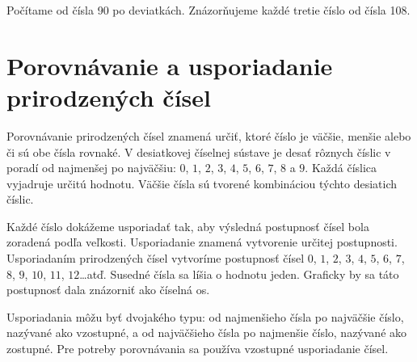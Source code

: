 \documentclass{article}
\begin{document}
\begin{center}
  Počítame od čísla 90 po deviatkách. Znázorňujeme každé tretie číslo od čísla 108. \vspace{5mm}

\end{center}


\section{Porovnávanie a usporiadanie prirodzených čísel}

Porovnávanie prirodzených čísel znamená určiť, ktoré číslo je väčšie, menšie alebo či sú obe čísla rovnaké. V desiatkovej číselnej sústave je desať rôznych číslic v poradí od najmenšej po najväčšiu: \(0\), \(1\), \(2\), \(3\), \(4\), \(5\), \(6\), \(7\), \(8\) a \(9\). Každá číslica vyjadruje určitú hodnotu. Väčšie čísla sú tvorené kombináciou týchto desiatich číslic.

Každé číslo dokážeme usporiadať tak, aby výsledná postupnosť čísel bola zoradená podľa veľkosti. Usporiadanie znamená vytvorenie určitej postupnosti. Usporiadaním prirodzených čísel vytvoríme postupnosť čísel \(0\), \(1\), \(2\), \(3\), \(4\), \(5\), \(6\), \(7\), \(8\), \(9\), \(10\), \(11\), \(12\)\dots atď. Susedné čísla sa líšia o hodnotu jeden. Graficky by sa táto postupnosť dala znázorniť ako číselná os.

\begin{center}
\end{center}

Usporiadania môžu byť dvojakého typu: od najmenšieho čísla po najväčšie číslo, nazývané ako vzostupné, a od najväčšieho čísla po najmenšie číslo, nazývané ako zostupné. Pre potreby porovnávania sa používa vzostupné usporiadanie čísel.
\end{document}
